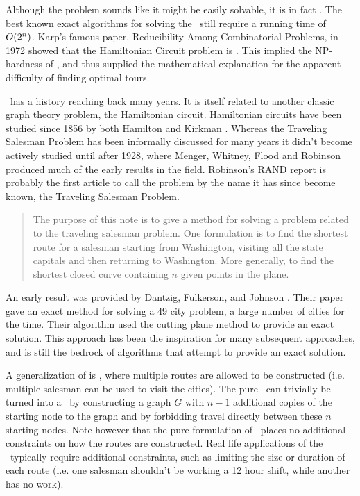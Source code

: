 Although the problem sounds like it might be easily solvable, it is in fact \nphard. The best known exact algorithms for solving the \TSP\ still require a running time of $\mbox{$O(2^n)$}$. Karp's famous paper, Reducibility Among Combinatorial Problems, in 1972 showed that the Hamiltonian Circuit problem is \npcomplete. This implied the NP-hardness of \TSP, and thus supplied the mathematical explanation for the apparent difficulty of finding optimal tours.


\TSP\ has a history reaching back many years. It is itself related to another classic graph theory problem, the Hamiltonian circuit. Hamiltonian circuits have been studied since 1856 by both Hamilton \cite{Hamilton:1856} and Kirkman \cite{Kirkman:1856}. Whereas the Traveling Salesman Problem has been informally discussed for many years \cite{Schrijver} it didn't become actively studied until after 1928, where Menger, Whitney, Flood and Robinson produced much of the early results in the field. Robinson's RAND report \cite{Robinson:1949} is probably the first article to call the problem by the name it has since become known, the Traveling Salesman Problem. 

\begin{quote}
  The purpose of this note is to give a method for solving a problem related to the traveling salesman problem. One formulation is to find the shortest route for a salesman starting from Washington, visiting all the state capitals and then returning to Washington. More generally, to find the shortest closed curve containing $n$ given points in the plane.
\end{quote}

An early result was provided by Dantzig, Fulkerson, and  Johnson \cite{Dantzig:1954}. Their paper gave an exact method for solving a 49 city problem, a large number of cities for the time. Their algorithm used the cutting plane method to provide an exact solution. This approach has been the inspiration for many subsequent approaches, and is still the bedrock of algorithms that attempt to provide an exact solution.  

A generalization of \TSP is \MTSP, where multiple routes are allowed to be constructed (i.e. multiple salesman can be used to visit the cities). The pure \MTSP\ can trivially be turned into a \TSP\ by constructing a graph $G$ with $n - 1$ additional copies of the starting node to the graph and by forbidding travel directly between these $n$ starting nodes. Note however that the pure formulation of \MTSP\ places no additional constraints on how the routes are constructed. Real life applications of the \MTSP\ typically require additional constraints, such as limiting the size or duration of each route (i.e. one salesman shouldn't be working a 12 hour shift, while another has no work).

